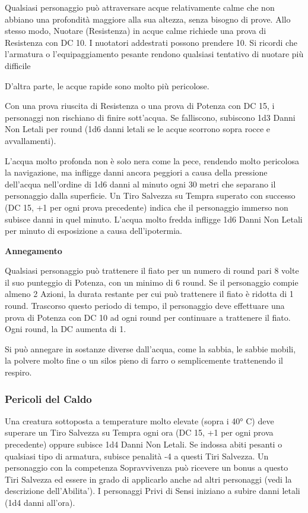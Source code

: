 \documentclass[a4paper,11pt,twoside,openany]{book}
\begin{document}
{\label{pericoli-dellacqua}

Qualsiasi personaggio può attraversare acque relativamente calme che non abbiano una profondità maggiore alla sua altezza, senza bisogno di prove. Allo stesso modo, Nuotare (Resistenza) in acque calme richiede una prova di Resistenza con DC 10. I nuotatori addestrati possono prendere 10. Si ricordi che l'armatura o l'equipaggiamento pesante rendono qualsiasi tentativo di nuotare più difficile

D'altra parte, le acque rapide sono molto più pericolose.

Con una prova riuscita di Resistenza o una prova di Potenza con DC 15, i personaggi non rischiano di finire sott'acqua. Se falliscono, subiscono 1d3 Danni Non Letali per round (1d6 danni letali se le acque scorrono sopra rocce e avvallamenti).

L'acqua molto profonda non è solo nera come la pece, rendendo molto pericolosa la navigazione, ma infligge danni ancora peggiori a causa della pressione dell'acqua nell'ordine di 1d6 danni al minuto ogni 30 metri che separano il personaggio dalla superficie. Un Tiro Salvezza su Tempra superato con successo (DC 15, +1 per ogni prova precedente) indica che il personaggio immerso non subisce danni in quel minuto. L'acqua molto fredda infligge 1d6 Danni Non Letali per minuto di esposizione a causa dell'ipotermia.

\textbf{Annegamento}

Qualsiasi personaggio può trattenere il fiato per un numero di round pari 8 volte il suo punteggio di Potenza, con un minimo di 6 round. Se il personaggio compie almeno 2 Azioni, la durata restante per cui può trattenere il fiato è ridotta di 1 round. Trascorso questo periodo di tempo, il personaggio deve effettuare una prova di Potenza con DC 10 ad ogni round per continuare a trattenere il fiato. Ogni round, la DC aumenta di 1.

Si può annegare in sostanze diverse dall'acqua, come la sabbia, le sabbie mobili, la polvere molto fine o un silos pieno di farro o semplicemente trattenendo il respiro.

\subsubsection{Pericoli del Caldo}

\label{pericoli-del-caldo}

Una creatura sottoposta a temperature molto elevate (sopra i 40° C) deve superare un Tiro Salvezza su Tempra ogni ora (DC 15, +1 per ogni prova precedente) oppure subisce 1d4 Danni Non Letali. Se indossa abiti pesanti o qualsiasi tipo di armatura, subisce penalità -4 a questi Tiri Salvezza. Un personaggio con la competenza Sopravvivenza può ricevere un bonus a questo Tiri Salvezza ed essere in grado di applicarlo anche ad altri personaggi (vedi la descrizione dell'Abilita'). I personaggi Privi di Sensi iniziano a subire danni letali (1d4 danni all'ora).

}
\end{document}
